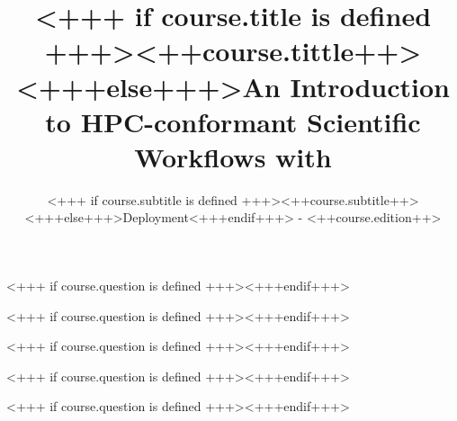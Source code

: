 \documentclass[english,xcolor=pdftex,dvipsnames]{beamer}
\title[<++course.shorttitle++>]{<+++ if course.title is defined +++><++course.tittle++><+++else+++>An Introduction to HPC-conformant Scientific Workflows with \Snakemake<+++endif+++>}
\subtitle{<+++ if course.subtitle is defined +++><++course.subtitle++><+++else+++>Deployment<+++endif+++> - <++course.edition++>}
\begin{document}

\sloppy

\begin{frame}[plain] %
  \titlepage
\end{frame}












<+++ if course.question is defined +++><+++endif+++>


<+++ if course.question is defined +++><+++endif+++>

% 


<+++ if course.question is defined +++><+++endif+++>


<+++ if course.question is defined +++><+++endif+++>


<+++ if course.question is defined +++><+++endif+++>
\end{document}
